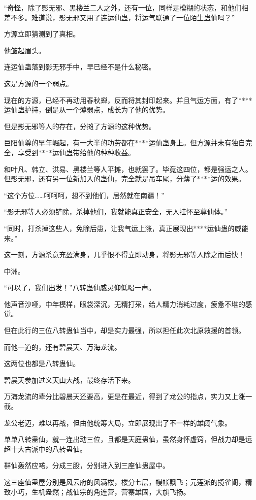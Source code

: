\begin{this_body}
“奇怪，除了影无邪、黑楼兰二人之外，还有一位，同样是模糊的状态，和他们相差不多。难道说，影无邪又用了连运仙蛊，将运气联通了一位陌生蛊仙吗？”

方源立即猜测到了真相。

他皱起眉头。

连运仙蛊落到影无邪手中，早已经不是什么秘密。

这是方源的一个弱点。

现在的方源，已经不再动用春秋蝉，反而将其封印起来。并且气运方面，有了****运仙蛊护持，倒是从一个薄弱点，成长为了他的优势。

但是影无邪等人的存在，分摊了方源的这种优势。

巨阳仙尊的早年崛起，有一大半的功劳都在****运仙蛊身上。但方源并未有独自完全，享受到****运仙蛊带给他的种种收益。

和叶凡、韩立、洪易、黑楼兰等人平摊，也就罢了。毕竟这四位，都是强运之人。但影无邪，还有另一位新加入的蛊仙，完全就是吊车尾，分薄了****运的效果。

“这个方位……呵呵呵，想不到他们，居然就在南疆！”

“影无邪等人必须铲除，杀掉他们，我就能真正安全，无人挂怀至尊仙体。”

“同时，打杀掉这些人，免除后患，让我气运上涨，真正展现出****运仙蛊的威能来。”

这一刻，方源杀意充盈满身，几乎恨不得立即动身，将影无邪等人除之而后快！

中洲。

“可以了，我们出发！”八转蛊仙威灵仰低喝一声。

他声音沙哑，中年模样，眼袋深沉，无精打采，给人精力消耗过度，疲惫不堪的感觉。

但在此行的三位八转蛊仙当中，却是实力最强，所以担任此次北原救援的首领。

而他一道的，还有碧晨天、万海龙流。

这两位也都是八转蛊仙。

碧晨天参加过义天山大战，最终存活下来。

万海龙流的辈分比碧晨天还要高，更是在最近，得到了龙公的指点，实力又上涨一截。

龙公老迈，难以再战，但由他统筹大局，立即展现出了不一样的雄阔气象。

单单八转蛊仙，就一连出动三位，且都是天庭蛊仙，虽然身怀虚窍，但战力却是远超十大古派中的八转蛊仙。

群仙轰然应喏，分成三股，分别进入到三座仙蛊屋中。

这三座仙蛊屋分别是风云府的风满楼，楼分七层，幔帐飘飞；元莲派的揽雀阁，精致小巧，生机盎然；战仙宗的角连营，营寨雄固，大旗飞扬。


\end{this_body}
